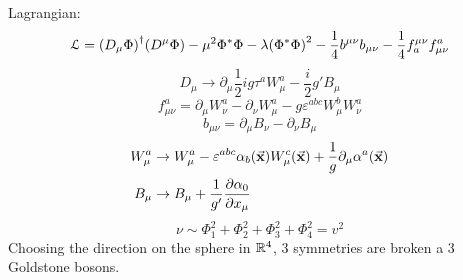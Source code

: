 \documentclass[../main/main.tex]{subfiles}
\begin{document}
Lagrangian:
\begin{equation}
  \mathcal{L} = \qty(D_ \mu \Phi )^\dagger \qty(D ^ \mu \Phi ) - \mu ^2 \Phi ^* \Phi - \lambda \qty(\Phi ^* \Phi )^2
  - \frac{1}{4} b^{\mu \nu } b_{\mu \nu } - \frac{1}{4} f_a^{\mu \nu } f_{\mu \nu }^a
\end{equation}
\begin{equation}
  D_ \mu  \rightarrow \partial_ \mu \frac{1}{2} i g \tau ^a W_ \mu ^a - \frac{i}{2} g' B _ \mu
\end{equation}
\begin{equation}
  f_ {\mu \nu }^a = \partial_ \mu W_ \nu ^a - \partial_ \nu W _ \mu ^a - g \varepsilon ^{abc} W _ \mu ^b  W_ \nu ^a
\end{equation}
\begin{equation}
  b_ {\mu \nu } = \partial_ \mu B _ \nu - \partial_ \nu  B _ \mu
\end{equation}
\begin{subequations}
\begin{align}
  W_ \mu ^a & \rightarrow W_ \mu ^a - \varepsilon ^{abc} \alpha _b (\va{x}) W_ \mu ^c (\va{x}) + \frac{1}{g} \partial_ \mu \alpha ^a (\va{x})    \\
  B _ \mu  & \rightarrow  B _ \mu + \frac{1}{g'} \pdv{\alpha _0}{x_ \mu }
\end{align}
\end{subequations}
\begin{equation}
  \nu \sim \Phi _1^2 + \Phi _2^2 + \Phi _3^2 +\Phi _4^2 = v^2
\end{equation}
Choosing the direction on the sphere in \( \mathbb{R}^4 \), 3 symmetries are broken a 3 Goldstone bosons.
\end{document}
